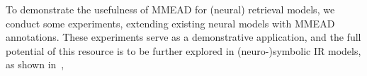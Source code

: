 


To demonstrate the usefulness of MMEAD for (neural) retrieval models, we conduct some experiments, extending existing neural models with MMEAD annotations.
These experiments serve as a demonstrative application, and the full potential of this resource is to be further explored in (neuro-)symbolic IR models, as shown in~\cite{Gerritse:2022:EMBERT,Tran:2022:DRE},


